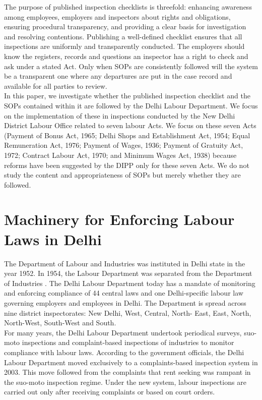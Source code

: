 \documentclass[a4paper, 12pt, twoside]{article}
\begin{document}
The purpose of published inspection checklists is threefold: enhancing awareness among employees, employers and inspectors about rights and obligations, ensuring procedural transparency, and providing a clear basis for investigation and resolving contentions. Publishing a well-defined checklist ensures that all inspections are uniformly and transparently conducted. The employers should know the registers, records and questions an inspector has a right to check and ask under a stated Act. Only when SOPs are consistently followed will the system be a transparent one where any departures are put in the case record and available for all parties to review. \\

In this paper, we investigate whether the published inspection checklist and the SOPs contained within it are followed by the Delhi Labour Department. We focus on the implementation of these in inspections conducted by the New Delhi District Labour Office related to seven labour Acts. We focus on these seven Acts (Payment of Bonus Act, 1965; Delhi Shops and Establishment Act, 1954; Equal Remuneration Act, 1976; Payment of Wages, 1936; Payment of Gratuity Act, 1972; Contract Labour Act, 1970; and Minimum Wages Act, 1938) because reforms have been suggested by the DIPP only for these seven Acts. We do not study the content and appropriateness of SOPs but merely whether they are followed. 


\section{Machinery for Enforcing Labour Laws in Delhi}\label{sec:1}

The Department of Labour and Industries was instituted in Delhi state in the year 1952. In 1954, the Labour Department was separated from the Department of Industries \parencite{officeofthelabourcommissioner}. The Delhi Labour Department today has a mandate of monitoring and enforcing compliance of 44 central laws and one Delhi-specific labour law governing employers and employees in Delhi. The Department is spread across nine district inspectorates: New Delhi, West, Central, North- East, East, North, North-West, South-West and South.\\

For many years, the Delhi Labour Department undertook periodical surveys, suo-moto inspections and complaint-based inspections of industries to monitor compliance with labour laws. According to the government officials, the Delhi Labour Department moved exclusively to a complaints-based inspection system in 2003. This move followed from the complaints that rent seeking was rampant in the suo-moto inspection regime. Under the new system, labour inspections are carried out only after receiving complaints or based on court orders.\\ 
\end{document}
